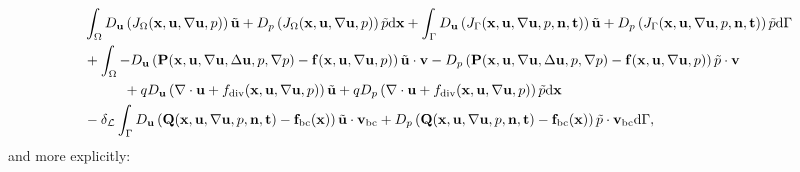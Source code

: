 \documentclass[oneside,11pt]{book}
\numberwithin{equation}{section}
\begin{document}
\begin{align*}
    &\int_\Omega D_{\bf u}\left(J_\Omega({\bf x},{\bf u},\nabla{\bf u},p)\right)\tilde{\bf u} + D_p\left(J_\Omega({\bf x},{\bf u},\nabla{\bf u},p)\right)\tilde{p}{\rm d}{\bf x} + \int_\Gamma D_{\bf u}\left(J_\Gamma({\bf x},{\bf u},\nabla{\bf u},p,{\bf n},{\bf t})\right)\tilde{\bf u} + D_p\left(J_\Gamma({\bf x},{\bf u},\nabla{\bf u},p,{\bf n},{\bf t})\right)\tilde{p}{\rm d}\Gamma\\
    &+ \int_\Omega -D_{\bf u}\left({\bf P}({\bf x},{\bf u},\nabla{\bf u},\Delta{\bf u},p,\nabla p) - {\bf f}({\bf x},{\bf u},\nabla{\bf u},p)\right)\tilde{\bf u}\cdot{\bf v} - D_p\left({\bf P}({\bf x},{\bf u},\nabla{\bf u},\Delta{\bf u},p,\nabla p) - {\bf f}({\bf x},{\bf u},\nabla{\bf u},p)\right)\tilde{p}\cdot{\bf v}\\
    &\hspace{1cm} + qD_{\bf u}\left(\nabla\cdot{\bf u} + f_{\rm div}({\bf x},{\bf u},\nabla{\bf u},p)\right)\tilde{\bf u} + qD_p\left(\nabla\cdot{\bf u} + f_{\rm div}({\bf x},{\bf u},\nabla{\bf u},p)\right)\tilde{p}{\rm d}{\bf x}\\
    &- \delta_{\mathcal{L}}\int_\Gamma D_{\bf u}\left({\bf Q}({\bf x},{\bf u},\nabla{\bf u},p,{\bf n},{\bf t}) - {\bf f}_{\rm bc}({\bf x})\right)\tilde{\bf u}\cdot{\bf v}_{\rm bc} + D_p\left({\bf Q}({\bf x},{\bf u},\nabla{\bf u},p,{\bf n},{\bf t}) - {\bf f}_{\rm bc}({\bf x})\right)\tilde{p}\cdot{\bf v}_{\rm bc}{\rm d}\Gamma,
\end{align*}
and more explicitly:
\end{document}
